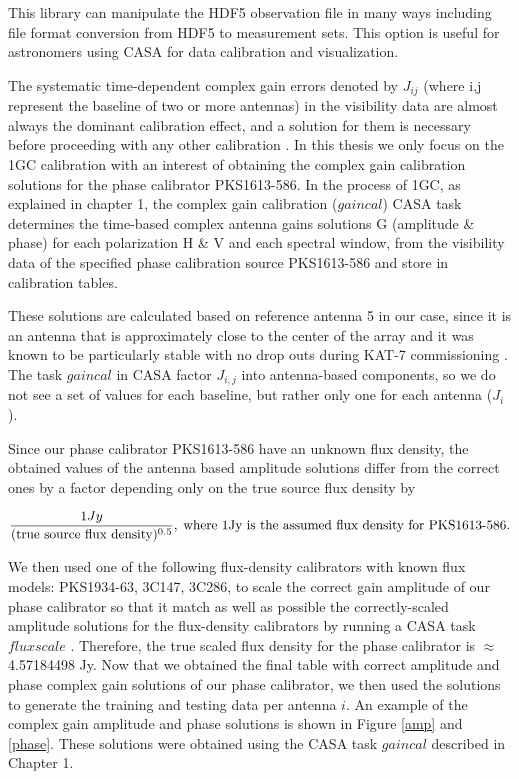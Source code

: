  This library can manipulate the HDF5 observation file in many ways including file format conversion from HDF5 to measurement sets. This option is useful for astronomers using CASA for data calibration and visualization.
 
The systematic time-dependent complex gain errors denoted by $J_{ij}$ (where i,j represent the baseline of two or more antennas) in the visibility data are almost always the dominant calibration effect, and a solution for them is necessary before proceeding with any other calibration \citep{ott2013casa}. In this thesis we only focus on the 1GC calibration with an interest of obtaining the complex gain calibration solutions for the phase calibrator PKS1613-586. In the process of 1GC, as explained in chapter 1, the complex gain calibration ($\textit{gaincal}$)  CASA task determines the time-based complex antenna gains solutions G (amplitude \& phase) for each polarization H \& V and each spectral window, from the visibility data of the specified phase calibration source PKS1613-586 and store in calibration tables.
 
These solutions are calculated based on reference antenna 5 in our case, since it is an antenna that is approximately close to the center of the array and it was known to be particularly stable with no drop outs during KAT-7 commissioning \citep{ott2013casa}. The task $\textit{gaincal}$ in CASA factor $J_{i,j}$ into antenna-based components, so we do not see a set of values for each baseline, but rather only one for each antenna ($J_i$)\citep{CosmoAIMS}. 

Since our phase calibrator PKS1613-586 have an unknown flux density, the obtained values of the antenna based amplitude solutions differ from the correct ones by a factor depending only on the true source flux density by 

\begin{equation}
\frac{1 Jy}{(\text{true source flux density})^{0.5}},\;  \text{where 1Jy is the assumed flux density for \text{PKS1613-586}}.
\end{equation} 

We then used one of the following flux-density calibrators with known flux models: PKS1934-63, 3C147, 3C286, to scale the correct gain amplitude of our phase calibrator so that it match as well as possible the correctly-scaled amplitude solutions for the  flux-density calibrators by running a CASA task $\textit{fluxscale}$ \citep{CosmoAIMS}. Therefore, the true scaled flux density for the phase calibrator is $\approx$ 4.57184498 Jy. Now that we obtained the final table with correct amplitude and phase complex gain solutions of our phase calibrator, we then used the solutions to generate the training and testing data per antenna $i$. An example of the complex gain amplitude and phase solutions is shown in Figure \ref{amp} and \ref{phase}. These solutions were obtained using the CASA task $gaincal$ described in Chapter 1. 

